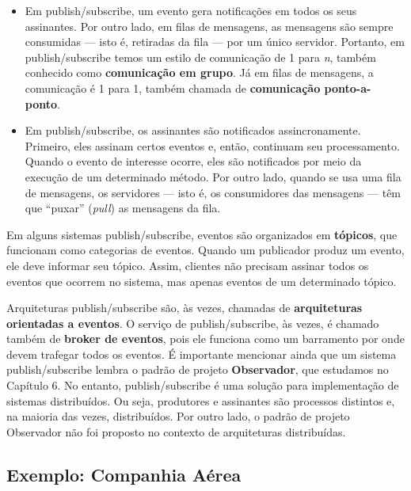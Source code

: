 \documentclass[
  11pt,
  twoside]{book}
\begin{document}
\begin{itemize}
\item
  Em publish/subscribe, um evento gera notificações em todos os seus
  assinantes. Por outro lado, em filas de mensagens, as mensagens são
  sempre consumidas --- isto é, retiradas da fila --- por um único
  servidor. Portanto, em publish/subscribe temos um estilo de
  comunicação de 1 para \emph{n}, também conhecido como
  \textbf{comunicação em grupo}. Já em filas de mensagens, a comunicação
  é 1 para 1, também chamada de \textbf{comunicação ponto-a-ponto}.
\item
  Em publish/subscribe, os assinantes são notificados assincronamente.
  Primeiro, eles assinam certos eventos e, então, continuam seu
  processamento. Quando o evento de interesse ocorre, eles são
  notificados por meio da execução de um determinado método. Por outro
  lado, quando se usa uma fila de mensagens, os servidores --- isto é,
  os consumidores das mensagens --- têm que ``puxar'' (\emph{pull}) as
  mensagens da fila.
\end{itemize}

Em alguns sistemas publish/subscribe, eventos são organizados em
\textbf{tópicos},  que funcionam como
categorias de eventos. Quando um publicador produz um evento, ele deve
informar seu tópico. Assim, clientes não precisam assinar todos os
eventos que ocorrem no sistema, mas apenas eventos de um determinado
tópico.

 
 Arquiteturas publish/subscribe são, às
vezes, chamadas de \textbf{arquiteturas orientadas a eventos}. O serviço
de publish/subscribe, às vezes, é chamado também de \textbf{broker de
eventos}, pois ele funciona como um barramento por onde devem trafegar
todos os eventos. É importante mencionar ainda que um sistema
publish/subscribe lembra o padrão de projeto \textbf{Observador}, que
estudamos no Capítulo 6. No entanto, publish/subscribe é uma solução
para implementação de sistemas distribuídos. Ou seja, produtores e
assinantes são processos distintos e, na maioria das vezes,
distribuídos. Por outro lado, o padrão de projeto Observador não foi
proposto no contexto de arquiteturas distribuídas.

\hypertarget{exemplo-companhia-auxe9rea}{%
\subsection{Exemplo: Companhia Aérea}\label{exemplo-companhia-auxe9rea}}
\end{document}
